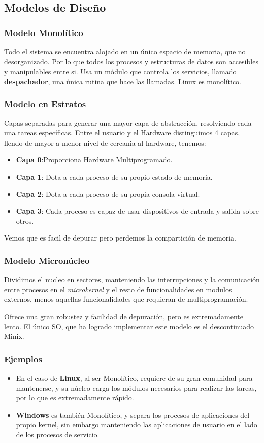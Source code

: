 \subsection{Modelos de Diseño}
\subsubsection{Modelo Monolítico}
\noindent Todo el sistema se encuentra alojado en un único espacio de memoria, que no desorganizado. Por lo que todos los procesos y estructuras de datos son accesibles y manipulables entre si. Usa un módulo que controla los servicios, llamado \textbf{despachador}, una única rutina que hace las llamadas. Linux es monolítico.
\subsubsection{Modelo en Estratos}
\noindent Capas separadas para generar una mayor capa de abstracción, resolviendo cada una tareas específicas. Entre el usuario y el Hardware distinguimos 4 capas, llendo de mayor a menor nivel de cercania al hardware, tenemos:
\begin{itemize}
        \item \textbf{Capa 0}:Proporciona Hardware Multiprogramado.\item \textbf{Capa 1}: Dota a cada proceso de su propio estado de memoria.\item \textbf{Capa 2}: Dota a cada proceso de su propia consola virtual.\item \textbf{Capa 3}: Cada proceso es capaz de usar dispositivos de entrada y salida sobre otros.
\end{itemize}
\noindent Vemos que es facil de depurar pero perdemos la compartición de memoria.
\subsubsection{Modelo Micronúcleo}
\noindent Dividimos el nucleo en sectores, manteniendo las interrupciones y la comunicación entre procesos en el \textit{microkernel} y el resto de funcionalidades en modulos externos, menos aquellas funcionalidades que requieran de multiprogramación.
\par \noindent Ofrece una gran robustez y facilidad de depuración, pero es extremadamente lento. El único SO, que ha logrado implementar este modelo es el descontinuado Minix.
\subsubsection{Ejemplos}
\begin{itemize}
        \item En el caso de \textbf{Linux}, al ser Monolítico, requiere de su gran comunidad para mantenerse, y su núcleo carga los módulos necesarios para realizar las tareas, por lo que es extremadamente rápido.
        \item \textbf{Windows} es también Monolítico, y separa los procesos de aplicaciones del propio kernel, sin embargo manteniendo las aplicaciones de usuario en el lado  de los procesos de servicio.
\end{itemize}